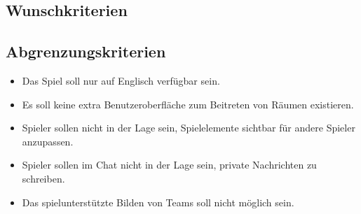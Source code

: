 \subsection{Wunschkriterien}
\begin{description}
\end{description}

\subsection{Abgrenzungskriterien}
\begin{itemize}
	\item Das Spiel soll nur auf Englisch verfügbar sein.
	\item Es soll keine extra Benutzeroberfläche zum Beitreten von Räumen existieren.
	\item Spieler sollen nicht in der Lage sein, Spielelemente sichtbar für andere Spieler anzupassen.
	\item Spieler sollen im Chat nicht in der Lage sein, private Nachrichten zu schreiben.
	\item Das spielunterstützte Bilden von Teams soll nicht möglich sein.
\end{itemize}